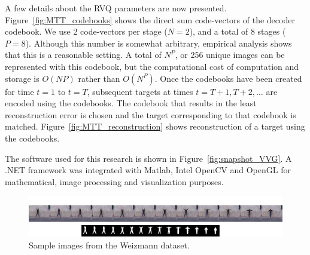 \documentclass[12pt,letterpaper,doublespaced,ETD,proposal]{gt-ece-thesis}
\begin{document}
\begin{Body}
A few details about the RVQ parameters are now presented.  Figure~\ref{fig:MTT_codebooks} shows the direct sum code-vectors of the decoder codebook.  We use 2 code-vectors per stage ($N=2$), and a total of 8 stages ($P=8$).  Although this number is somewhat arbitrary, empirical analysis shows that this is a reasonable setting.  A total of $N^P$, or 256 unique images can be represented with this codebook, but the computational cost of computation and storage is $O(NP)$ rather than $O(N^P)$.  Once the codebooks have been created for time $t=1$ to $t=T$, subsequent targets at times $t=T+1, T+2, \ldots$ are encoded using the codebooks.  The codebook that results in the least reconstruction error is chosen and the target corresponding to that codebook is matched.  Figure~\ref{fig:MTT_reconstruction} shows reconstruction of a target using the codebooks.  

The software used for this research is shown in Figure~\ref{fig:snapshot_VVG}.  A .NET framework was integrated with Matlab, Intel OpenCV and OpenGL for mathematical, image processing and visualization purposes.  

			\begin{figure}		
			\centering		
					\includegraphics[width=1.0\textwidth]{figs/Proposal_fig5_RVQ_HMM_Weizmann_dataset}
					\centering
					\caption{Sample images from the Weizmann dataset.}
					\label{fig:Weizmann_sequence}
			\end{figure}
			


\end{Body}
\end{document}
